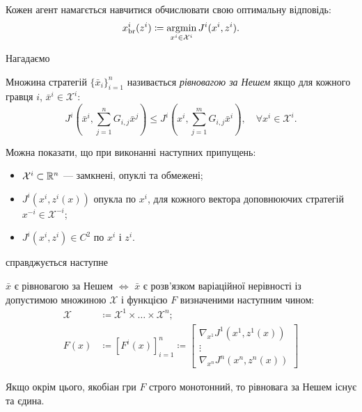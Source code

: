 Кожен агент намагється навчитися обчислювати свою оптимальну відповідь:
\begin{equation}
    x_\text{br}^i(z^i) \coloneqq \operatorname*{argmin}_{x^i \in \mathcal{X}^i} J^i(x^i, z^i).
\end{equation}

Нагадаємо
\begin{definition}
    Множина стратегій $\{\bar x_i\}_{i = 1}^n$ називається \emph{рівновагою за Нешем} якщо для кожного гравця $i$, $\bar x^i \in \mathcal{X}^i$:
    \begin{equation}
        J^i \left( \bar x^i, \sum_{j = 1}^n G_{i,j} \bar x^j \right) \le J^i \left( x^i, \sum_{j = 1}^m G_{i,j} \bar x^i \right), \quad \forall x^i \in \mathcal{X}^i.
    \end{equation}
\end{definition}

Можна показати, що при виконанні наступних припущень:
\begin{itemize}
    \item $\mathcal{X}^i \subset \mathbb{R}^n$ --- замкнені, опуклі та обмежені;
    \item $J^i(x^i, z^i(x))$ опукла по $x^i$, для кожного вектора доповнюючих стратегій $x^{-i} \in \mathcal{X}^{-i}$;
    \item $J^i(x^i, z^i) \in C^2$ по $x^i$ і $z^i$.
\end{itemize}
справджується наступне
\begin{proposition}
    $\bar x$ є рівновагою за Нешем $\iff$ $\bar x$ є розв'язком варіаційної нерівності із допустимою множиною $\mathcal{X}$ і функцією $F$ визначеними наступним чином:
    \begin{align}
        \mathcal{X} &\coloneqq \mathcal{X}^1 \times \dots \times \mathcal{X}^n; \\
        F(x) &\coloneqq [F^i(x)]_{i = 1}^n \coloneqq \begin{bmatrix}
            \nabla_{x^1} J^1(x^1, z^1(x)) \\
            \vdots \\
            \nabla_{x^n} J^n(x^n, z^n(x)) 
        \end{bmatrix}
    \end{align}
\end{proposition}

\begin{proposition}
    Якщо окрім цього, якобіан гри $F$ строго монотонний, то рівновага за Нешем існує та єдина.
\end{proposition}


